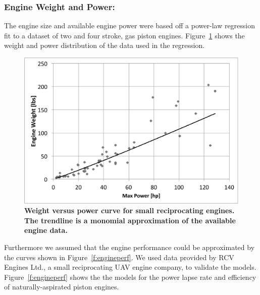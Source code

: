 \documentclass[journal]{aiaa-tc}%
\begin{document}
 \subsubsection{Engine Weight and Power: }  The engine size and available engine power were based off a power-law regression fit to a dataset of two and four stroke, gas piston engines.  Figure~\ref{f:powervsweight} shows the weight and power distribution of the data used in the regression. 
 
\begin{figure}[h!]
    \begin{center}
    \includegraphics[width = .65\textwidth]{powervsweight}
    \caption{ \textbf{Weight versus power curve for small reciprocating engines.\cite{smallengines} The trendline is a monomial approximation of the available engine data.} }
    \label{f:powervsweight}
    \end{center}
\end{figure}

Furthermore we assumed that the engine performance could be approximated by the curves shown in Figure~\ref{f:engineperf}. We used data provided by RCV Engines Ltd., a small reciprocating UAV engine company, to validate the models. Figure~\ref{f:engineperf} shows the the models for the power lapse rate and efficiency of naturally-aspirated piston engines. 
\end{document}
